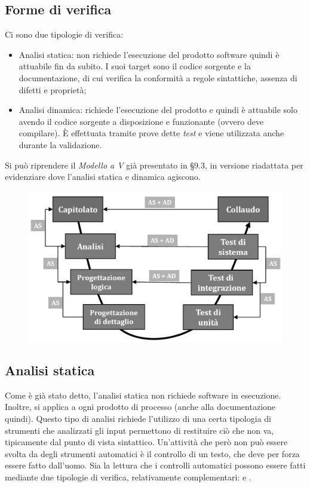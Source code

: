 \documentclass[../main]{subfiles}
\begin{document}
\subsection{Forme di verifica}
Ci sono due tipologie di verifica:
\begin{itemize}
    \item Analisi statica: non richiede l'esecuzione del prodotto software quindi è attuabile fin da subito. I suoi target sono il codice sorgente e la documentazione, di cui verifica la conformità a regole sintattiche, assenza di difetti e proprietà;
    \item Analisi dinamica: richiede l'esecuzione del prodotto e quindi è attuabile solo avendo il codice sorgente a disposizione e funzionante (ovvero deve compilare). È effettuata tramite prove dette \textit{test} e viene utilizzata anche durante la validazione.
\end{itemize}
Si può riprendere il \textit{Modello a V} già presentato in §9.3, in versione riadattata per evidenziare dove l'analisi statica e dinamica agiscono.
\begin{figure}[h]
    \begin{center}
        \includegraphics[scale=0.4]{immagini/vmodel2.jpg}
    \end{center}
\end{figure}
\subsection{Analisi statica}
Come è già stato detto, l'analisi statica non richiede software in esecuzione. Inoltre, si applica a ogni prodotto di processo (anche alla documentazione quindi).\newline
Questo tipo di analisi richiede l'utilizzo di una certa tipologia di strumenti che analizzati gli input permettono di restituire ciò che non va, tipicamente dal punto di vista sintattico.
Un'attività che però non può essere svolta da degli strumenti automatici è il controllo di un testo, che deve per forza essere fatto dall'uomo.
Sia la lettura che i controlli automatici possono essere fatti mediante due tipologie di verifica, relativamente complementari:  e .
\end{document}
